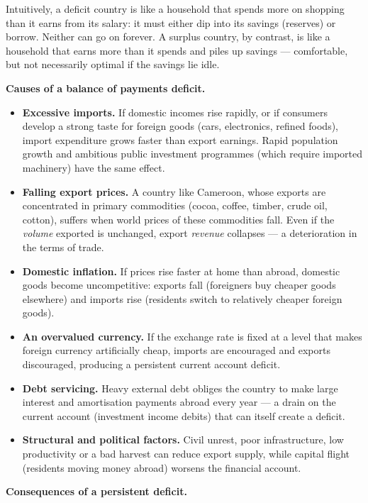 \documentclass[11pt]{article}
\begin{document}
Intuitively, a deficit country is like a household that spends more on shopping than it earns from its salary: it must either dip into its savings (reserves) or borrow. Neither can go on forever. A surplus country, by contrast, is like a household that earns more than it spends and piles up savings --- comfortable, but not necessarily optimal if the savings lie idle.

\textbf{Causes of a balance of payments deficit.}\par

\begin{itemize}
\item \textbf{Excessive imports.} If domestic incomes rise rapidly, or if consumers develop a strong taste for foreign goods (cars, electronics, refined foods), import expenditure grows faster than export earnings. Rapid population growth and ambitious public investment programmes (which require imported machinery) have the same effect.
\item \textbf{Falling export prices.} A country like Cameroon, whose exports are concentrated in primary commodities (cocoa, coffee, timber, crude oil, cotton), suffers when world prices of these commodities fall. Even if the \emph{volume} exported is unchanged, export \emph{revenue} collapses --- a deterioration in the terms of trade.
\item \textbf{Domestic inflation.} If prices rise faster at home than abroad, domestic goods become uncompetitive: exports fall (foreigners buy cheaper goods elsewhere) and imports rise (residents switch to relatively cheaper foreign goods).
\item \textbf{An overvalued currency.} If the exchange rate is fixed at a level that makes foreign currency artificially cheap, imports are encouraged and exports discouraged, producing a persistent current account deficit.
\item \textbf{Debt servicing.} Heavy external debt obliges the country to make large interest and amortisation payments abroad every year --- a drain on the current account (investment income debits) that can itself create a deficit.
\item \textbf{Structural and political factors.} Civil unrest, poor infrastructure, low productivity or a bad harvest can reduce export supply, while capital flight (residents moving money abroad) worsens the financial account.
\end{itemize}

\textbf{Consequences of a persistent deficit.}\par
\end{document}

